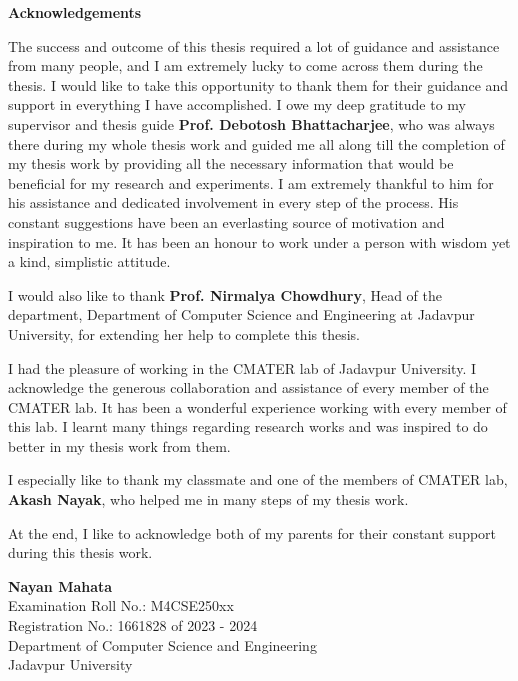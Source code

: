 
\thispagestyle{empty}

\begin{center}
    \LARGE \textbf{Acknowledgements}
\end{center}

\vspace{0.5cm}

\noindent
The success and outcome of this thesis required a lot of guidance and assistance from many people, and I am extremely lucky to come across them during the thesis. I would like to take this opportunity to thank them for their guidance and support in everything I have accomplished. I owe my deep gratitude to my supervisor and thesis guide \textbf{Prof. Debotosh Bhattacharjee}, who was always there during my whole thesis work and guided me all along till the completion of my thesis work by providing all the necessary information that would be beneficial for my research and experiments. I am extremely thankful to him for his assistance and dedicated involvement in every step of the process. His constant suggestions have been an everlasting source of motivation and inspiration to me. It has been an honour to work under a person with wisdom yet a kind, simplistic attitude.

\vspace{0.5cm}
\noindent
I would also like to thank \textbf{Prof. Nirmalya Chowdhury}, Head of the department, Department of Computer Science and Engineering at Jadavpur University, for extending her help to complete this thesis.

\vspace{0.5cm}
\noindent
I had the pleasure of working in the CMATER lab of Jadavpur University. I acknowledge the generous collaboration and assistance of every member of the CMATER lab. It has been a wonderful experience working with every member of this lab. I learnt many things regarding research works and was inspired to do better in my thesis work from them.

\vspace{0.5cm}
\noindent
I especially like to thank my classmate and one of the members of CMATER lab, \textbf{Akash Nayak}, who helped me in many steps of my thesis work.

\vspace{0.5cm}
\noindent
At the end, I like to acknowledge both of my parents for their constant support during this thesis work.

\vspace{1.5cm}
\noindent
\textbf{Nayan Mahata} \\
Examination Roll No.: M4CSE250xx \\
Registration No.: 1661828 of 2023 - 2024 \\
Department of Computer Science and Engineering \\
Jadavpur University

